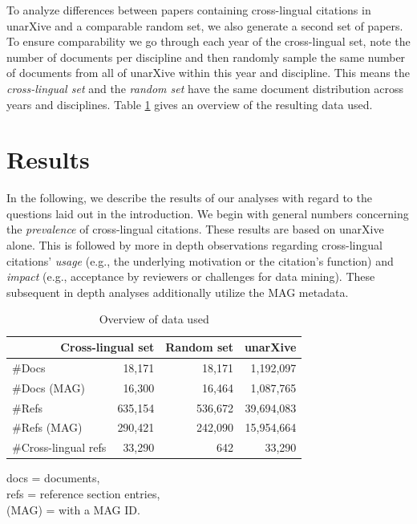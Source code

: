 To analyze differences between papers containing cross-lingual citations in unarXive and a comparable random set, we also generate a second set of papers. To ensure comparability we go through each year of the cross-lingual set, note the number of documents per discipline and then randomly sample the same number of documents from all of unarXive within this year and discipline. This means the \emph{cross-lingual set} and the \emph{random set} have the same document distribution across years and disciplines. Table \ref{tab:dataused} gives an overview of the resulting data used.

\section{Results}\label{sec:results}

In the following, we describe the results of our analyses with regard to the questions laid out in the introduction. We begin with general numbers concerning the \emph{prevalence} of cross-lingual citations. These results are based on unarXive alone. This is followed by more in depth observations regarding cross-lingual citations' \emph{usage} (e.g., the underlying motivation or the citation's function) and \emph{impact} (e.g., acceptance by reviewers or challenges for data mining). These subsequent in depth analyses additionally utilize the MAG metadata.

\begin{table}
\caption{Overview of data used}
 \label{tab:dataused}
  \centering
  \begin{small}
 \begin{threeparttable}
 \begin{tabular}{lrrr}
 \toprule
   \multicolumn{2}{r}{Cross-lingual set} & Random set & unarXive \\
   \midrule
   \#Docs & 18,171 & 18,171 & 1,192,097 \\
   \#Docs (MAG) & 16,300 & 16,464 & 1,087,765 \\
   \#Refs & 635,154 & 536,672 & 39,694,083 \\
   \#Refs (MAG) & 290,421 & 242,090 & 15,954,664 \\
   \#Cross-lingual refs & 33,290 & 642 & 33,290 \\
   \bottomrule
 \end{tabular}
 \begin{tablenotes}
    \item *docs  =  documents,\\\hphantom{*}refs  =  reference section entries,\\\hphantom{*}(MAG) = with a MAG ID.
  \end{tablenotes}
\end{threeparttable}
  \end{small}
\end{table}

